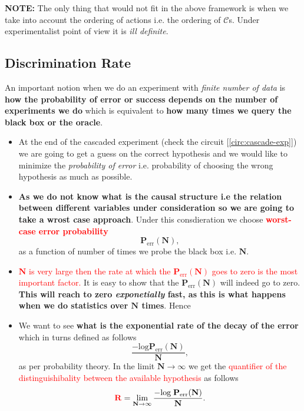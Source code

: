 \documentclass[a4paper,11pt]{article}
\begin{document}
	\noindent\textbf{NOTE:} The only thing that would not fit in the above framework is when we take into account the ordering of actions i.e. the ordering of $\mathcal{C}$s. Under experimentalist point of view it is \textit{ill definite}.
	
	\subsection{Discrimination Rate}
	An important notion when we do an experiment with \textit{finite number of data} is \textbf{how the probability of error or success depends on the number of experiments we do} which is equivalent to \textbf{how many times we query the black box or the oracle}.
	\\
	
	\begin{itemize}
	\item At the end of the cascaded experiment (check the circuit [\ref{circ:cascade-exp}]) we are going to get a guess on the correct hypothesis and we would like to minimize the \textit{probability of error} i.e. probability of choosing the wrong hypothesis as much as possible.
	\\
	
	\item \textbf{As we do not know what is the causal structure i.e the relation between different variables under consideration so we are going to take a wrost case approach}. Under this consdieration we choose \textbf{\textcolor{red}{worst-case error probability}}
	\begin{equation}
		\mathbf{P}_\text{err}(\mathbf{N}),
	\end{equation} 
	as a function of number of times we probe the black box i.e. $\mathbf{N}$.

	\item \textcolor{red}{$\mathbf{N}$ is very large then the rate at which the $\mathbf{P}_\text{err}(\mathbf{N})$ goes to zero is the most important factor.} It is easy to show that the $\mathbf{P}_\text{err}(\mathbf{N})$ will indeed go to zero. \textbf{This will reach to zero \textit{exponetially} fast, as this is what happens when we do statistics over $\mathbf{N}$ times}. Hence
	\item We want to see \textbf{what is the exponential rate of the decay of the error} which in turns defined as follows
	\begin{equation}
		\frac{-\text{log}\mathbf{P}_\text{err}(\mathbf{N})}{\mathbf{N}},\nonumber
	\end{equation}
	as per probability theory. In the limit $\mathbf{N}\rightarrow\infty$ we get the \textcolor{red}{quantifier of the distinguishibality between the available hypothesis} as follows
	\begin{equation}
		\mathbf{\textcolor{red}{R}} = \lim_{\mathbf{N}\rightarrow\infty} \frac{-\text{log}\;\mathbf{P}_\text{err}(\mathbf{N})}{\mathbf{N}}.
	\end{equation}
	\end{itemize}
\end{document}
